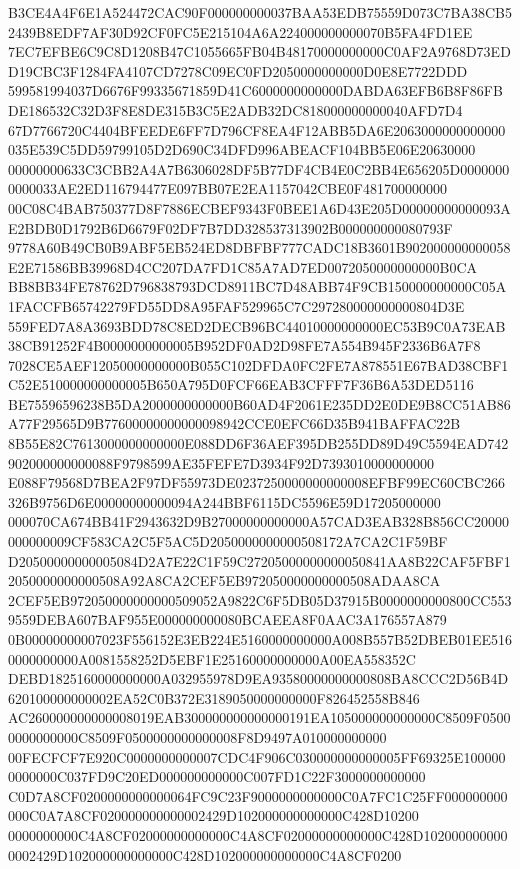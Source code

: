 \documentclass[UTF8,fontset=fandol,zihao=-4,a4paper]{ctexart}
\begin{document}
{{B3CE4A4F6E1A524472CAC90F000000000037BAA53EDB75559D073C7BA38CB52439B8EDF7AF30D92CF0FC5E215104A6A224000000000070B5FA4FD1EE
7EC7EFBE6C9C8D1208B47C1055665FB04B48170000000000C0AF2A9768D73EDD19CBC3F1284FA4107CD7278C09EC0FD2050000000000D0E8E7722DDD
599581994037D6676F99335671859D41C6000000000000DABDA63EFB6B8F86FBDE186532C32D3F8E8DE315B3C5E2ADB32DC818000000000040AFD7D4
67D7766720C4404BFEEDE6FF7D796CF8EA4F12ABB5DA6E2063000000000000035E539C5DD59799105D2D690C34DFD996ABEACF104BB5E06E20630000
00000000633C3CBB2A4A7B6306028DF5B77DF4CB4E0C2BB4E656205D00000000000033AE2ED116794477E097BB07E2EA1157042CBE0F481700000000
00C08C4BAB750377D8F7886ECBEF9343F0BEE1A6D43E205D00000000000093AE2BDB0D1792B6D6679F02DF7B7DD328537313902B000000000080793F
9778A60B49CB0B9ABF5EB524ED8DBFBF777CADC18B3601B902000000000058E2E71586BB39968D4CC207DA7FD1C85A7AD7ED0072050000000000B0CA
BB8BB34FE78762D796838793DCD8911BC7D48ABB74F9CB150000000000C05A1FACCFB65742279FD55DD8A95FAF529965C7C297280000000000804D3E
559FED7A8A3693BDD78C8ED2DECB96BC44010000000000EC53B9C0A73EAB38CB91252F4B0000000000005B952DF0AD2D98FE7A554B945F2336B6A7F8
7028CE5AEF12050000000000B055C102DFDA0FC2FE7A878551E67BAD38CBF1C52E510000000000005B650A795D0FCF66EAB3CFFF7F36B6A53DED5116
BE75596596238B5DA2000000000000B60AD4F2061E235DD2E0DE9B8CC51AB86A77F29565D9B77600000000000098942CCE0EFC66D35B941BAFFAC22B
8B55E82C7613000000000000E088DD6F36AEF395DB255DD89D49C5594EAD742902000000000088F9798599AE35FEFE7D3934F92D7393010000000000
E088F79568D7BEA2F97DF55973DE0237250000000000008EFBF99EC60CBC266326B9756D6E00000000000094A244BBF6115DC5596E59D17205000000
000070CA674BB41F2943632D9B27000000000000A57CAD3EAB328B856CC20000000000009CF583CA2C5F5AC5D2050000000000508172A7CA2C1F59BF
D20500000000005084D2A7E22C1F59C27205000000000050841AA8B22CAF5FBF12050000000000508A92A8CA2CEF5EB972050000000000508ADAA8CA
2CEF5EB972050000000000509052A9822C6F5DB05D37915B0000000000800CC5539559DEBA607BAF955E000000000080BCAEEA8F0AAC3A176557A879
0B00000000007023F556152E3EB224E5160000000000A008B557B52DBEB01EE5160000000000A0081558252D5EBF1E25160000000000A00EA558352C
DEBD1825160000000000A032955978D9EA93580000000000808BA8CCC2D56B4D620100000000002EA52C0B372E3189050000000000F826452558B846
AC260000000000008019EAB300000000000000191EA105000000000000C8509F05000000000000C8509F0500000000000008F8D9497A010000000000
00FECFCF7E920C0000000000007CDC4F906C030000000000005FF69325E1000000000000C037FD9C20ED000000000000C007FD1C22F3000000000000
C0D7A8CF0200000000000064FC9C23F9000000000000C0A7FC1C25FF000000000000C0A7A8CF020000000000002429D102000000000000C428D10200
0000000000C4A8CF02000000000000C4A8CF02000000000000C428D1020000000000002429D102000000000000C428D102000000000000C4A8CF0200
}}
\end{document}
